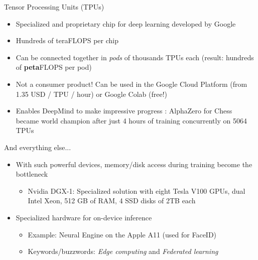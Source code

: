 \documentclass[11pt,compress,t,notes=noshow, xcolor=table]{beamer}
\begin{document}
\begin{frame} {Tensor Processing Units (TPUs)}
  \begin{itemize}
    \item Specialized and proprietary chip for deep learning developed by Google
    \item Hundreds of teraFLOPS per chip
    \item Can be connected together in \emph{pods} of thousands TPUs each (result: hundreds of \textbf{peta}FLOPS per pod)
    \item Not a consumer product! Can be used in the Google Cloud Platform (from 1.35 USD / TPU / hour) or Google Colab (free!)
    \item Enables DeepMind to make impressive progress : AlphaZero for Chess became world champion after just 4 hours of training concurrently on 5064 TPUs
  \end{itemize}
\end{frame}

\begin{frame} {And everything else...}
  \begin{itemize}
    \item With such powerful devices, memory/disk access during training become the bottleneck
    \begin{itemize}
      \item Nvidia DGX-1: Specialized solution with eight Tesla V100 GPUs, dual Intel Xeon, 512 GB of RAM, 4 SSD disks of 2TB each
    \end{itemize}
    \item Specialized hardware for on-device inference
    \begin{itemize}
      \item Example: Neural Engine on the Apple A11 (used for FaceID)
      \item Keywords/buzzwords: \emph{Edge computing} and \emph{Federated learning}
    \end{itemize}
  \end{itemize}
\end{frame}

\end{document}
